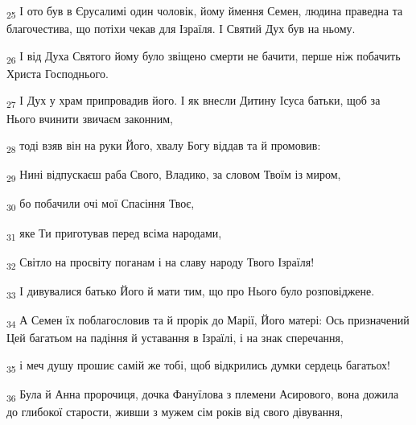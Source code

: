 \begin{tcolorbox}
\textsubscript{25} І ото був в Єрусалимі один чоловік, йому ймення Семен, людина праведна та благочестива, що потіхи чекав для Ізраїля. І Святий Дух був на ньому.
\end{tcolorbox}
\begin{tcolorbox}
\textsubscript{26} І від Духа Святого йому було звіщено смерти не бачити, перше ніж побачить Христа Господнього.
\end{tcolorbox}
\begin{tcolorbox}
\textsubscript{27} І Дух у храм припровадив його. І як внесли Дитину Ісуса батьки, щоб за Нього вчинити звичаєм законним,
\end{tcolorbox}
\begin{tcolorbox}
\textsubscript{28} тоді взяв він на руки Його, хвалу Богу віддав та й промовив:
\end{tcolorbox}
\begin{tcolorbox}
\textsubscript{29} Нині відпускаєш раба Свого, Владико, за словом Твоїм із миром,
\end{tcolorbox}
\begin{tcolorbox}
\textsubscript{30} бо побачили очі мої Спасіння Твоє,
\end{tcolorbox}
\begin{tcolorbox}
\textsubscript{31} яке Ти приготував перед всіма народами,
\end{tcolorbox}
\begin{tcolorbox}
\textsubscript{32} Світло на просвіту поганам і на славу народу Твого Ізраїля!
\end{tcolorbox}
\begin{tcolorbox}
\textsubscript{33} І дивувалися батько Його й мати тим, що про Нього було розповіджене.
\end{tcolorbox}
\begin{tcolorbox}
\textsubscript{34} А Семен їх поблагословив та й прорік до Марії, Його матері: Ось призначений Цей багатьом на падіння й уставання в Ізраїлі, і на знак сперечання,
\end{tcolorbox}
\begin{tcolorbox}
\textsubscript{35} і меч душу прошиє самій же тобі, щоб відкрились думки сердець багатьох!
\end{tcolorbox}
\begin{tcolorbox}
\textsubscript{36} Була й Анна пророчиця, дочка Фануїлова з племени Асирового, вона дожила до глибокої старости, живши з мужем сім років від свого дівування,
\end{tcolorbox}
